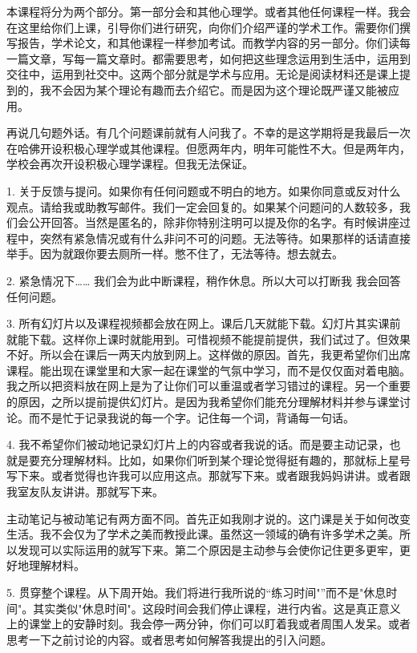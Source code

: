 本课程将分为两个部分。第一部分会和其他心理学。或者其他任何课程一样。我会在这里给你们上课，引导你们进行研究，向你们介绍严谨的学术工作。需要你们撰写报告，学术论文，和其他课程一样参加考试。而教学内容的另一部分。你们读每一篇文章，写每一篇文章时。都需要思考，如何把这些理念运用到生活中，运用到交往中，运用到社交中。这两个部分就是学术与应用。无论是阅读材料还是课上提到的，我不会因为某个理论有趣而去介绍它。而是因为这个理论既严谨又能被应用。

再说几句题外话。有几个问题课前就有人问我了。不幸的是这学期将是我最后一次在哈佛开设积极心理学或其他课程。但愿两年内，明年可能性不大。但是两年内，学校会再次开设积极心理学课程。但我无法保证。

1. 关于反馈与提问。如果你有任何问题或不明白的地方。如果你同意或反对什么观点。请给我或助教写邮件。我们一定会回复的。如果某个问题问的人数较多，我们会公开回答。当然是匿名的，除非你特别注明可以提及你的名字。有时候讲座过程中，突然有紧急情况或有什么非问不可的问题。无法等待。如果那样的话请直接举手。因为就跟你要去厕所一样。憋不住了，无法等待。想去就去。

2. 紧急情况下…… 我们会为此中断课程，稍作休息。所以大可以打断我 我会回答任何问题。

3. 所有幻灯片以及课程视频都会放在网上。课后几天就能下载。幻灯片其实课前就能下载。这样你上课时就能用到。可惜视频不能提前提供，我们试过了。但效果不好。所以会在课后一两天内放到网上。这样做的原因。首先，我更希望你们出席课程。能出现在课堂里和大家一起在课堂的气氛中学习，而不是仅仅面对着电脑。我之所以把资料放在网上是为了让你们可以重温或者学习错过的课程。另一个重要的原因，之所以提前提供幻灯片。是因为我希望你们能充分理解材料并参与课堂讨论。而不是忙于记录我说的每一个字。记住每一个词，背诵每一句话。

4. 我不希望你们被动地记录幻灯片上的内容或者我说的话。而是要主动记录，也就是要充分理解材料。比如，如果你们听到某个理论觉得挺有趣的，那就标上星号写下来。或者觉得也许我可以应用这点。那就写下来。或者跟我妈妈讲讲。或者跟我室友队友讲讲。那就写下来。

主动笔记与被动笔记有两方面不同。首先正如我刚才说的。这门课是关于如何改变生活。我不会仅为了学术之美而教授此课。虽然这一领域的确有许多学术之美。所以发现可以实际运用的就写下来。第二个原因是主动参与会使你记住更多更牢，更好地理解材料。

5. 贯穿整个课程。从下周开始。我们将进行我所说的“练习时间"”而不是"休息时间"。其实类似"休息时间"。这段时间会我们停止课程，进行内省。这是真正意义上的课堂上的安静时刻。我会停一两分钟，你们可以盯着我或者周围人发呆。或者思考一下之前讨论的内容。或者思考如何解答我提出的引入问题。

